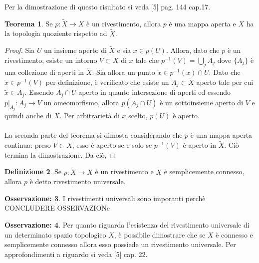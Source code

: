 \documentclass[12pt,a4paper]{report}
\theoremstyle{definition}
\newtheorem{Def}{Definizione}[chapter]
\newtheorem{Theo}[Def]{Teorema}
\theoremstyle{definition}
\theoremstyle{definition}
\theoremstyle{definition}
\newtheorem{Obs}[Def]{Osservazione:}
\begin{document}
Per la dimostrazione di questo risultato si veda [5] pag. 144 cap.17.
\begin{Theo}
	Se $p:\tilde{X}\rightarrow X$ è un rivestimento, allora $p$ è una mappa aperta e $X$ ha la topologia quoziente rispetto ad $\tilde{X}$.
\end{Theo}
\begin{proof}
	Sia $U$
 un insieme aperto di $\tilde{X}$ e sia $x\in p(U)$. Allora, dato che $p$ è un rivestimento, esiste un intorno $V\subset X$ di $x$ tale che $p^{-1}(V)=\bigcup_jA_j$ dove $\{A_j\}$ è una collezione di aperti in $\tilde{X}$. Sia allora un punto $\tilde{x}\in p^{-1}(x)\cap U$. Dato che $\tilde{x}\in p^{-1}(V)$ per definizione, è verificato che esiste un $A_j\subset \tilde{X}$ aperto tale per cui $\tilde{x}\in A_j$. Essendo $A_j\cap U$ aperto in quanto intersezione di aperti ed essendo $p|_{A_j}:A_j\rightarrow V$ un omeomorfismo, allora $p(A_j\cap U)$ è un sottoinsieme aperto di $V$ e quindi anche di $X$. Per arbitrarietà di $x$ scelto, $p(U)$ è aperto.\\
 \\
 La seconda parte del teorema si dimosta considerando che $p$ è una mappa aperta continua: preso $V\subset X$, esso è aperto se e solo se $p^{-1}(V)$ è aperto in $\tilde{X}$. Ciò termina la dimostrazione.
 Da ciò, 
\end{proof}
\begin{Def}
	Se $p:\tilde{X}\rightarrow X$ è un rivestimento e $\tilde{X}$ è semplicemente connesso, allora $p$ è detto rivestimento universale.
\end{Def}
\begin{Obs}
	I rivestimenti universali sono imporanti perchè CONCLUDERE OSSERVAZIONe
\end{Obs}
\begin{Obs}
	Per quanto riguarda l'esistenza del rivestimento universale di un determinato spazio topologico $X$, è possibile dimostrare che se $X$ è connesso e semplicemente connesso allora esso possiede un rivestimento universale. Per approfondimenti a riguardo si veda [5] cap. 22.
\end{Obs}
\end{document}
